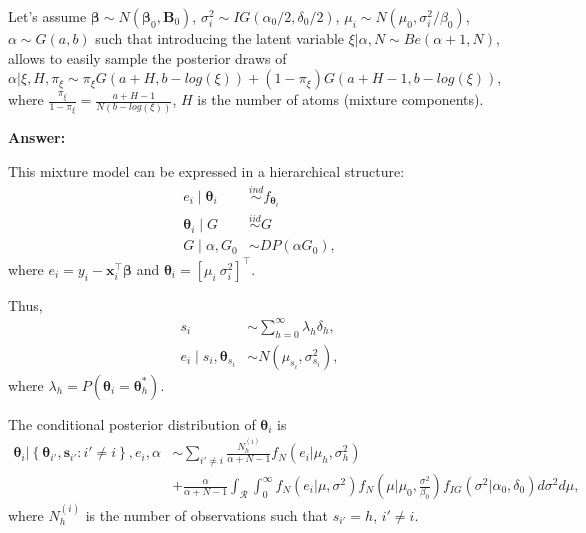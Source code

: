 \begin{enumerate}[leftmargin=*]
Let's assume $\boldsymbol{\beta}\sim N(\boldsymbol{\beta}_0,\boldsymbol{B}_0)$, $\sigma_i^2\sim IG(\alpha_0/2,\delta_0/2)$, $\mu_i\sim N(\mu_0,\sigma_i^2/\beta_0)$, $\alpha\sim G(a,b)$ such that introducing the latent variable $\xi|\alpha,N\sim Be(\alpha+1,N)$, allows to easily sample the posterior draws of  $\alpha|\xi,H,\pi_{\xi}\sim\pi_{\xi}{G}(a+H,b-log(\xi))+(1-\pi_{\xi}){G}(a+H-1,b-log(\xi))$, where $\frac{\pi_{\xi}}{1-\pi_{\xi}}=\frac{a+H-1}{N(b-log(\xi))}$, $H$ is the number of atoms (mixture components). 

\textbf{Answer:}

This mixture model can be expressed in a hierarchical structure:
\begin{align*}
	e_i\mid \boldsymbol{\theta}_i & \stackrel{ind}{\sim}f_{\boldsymbol{\theta}_i}\\
	\boldsymbol{\theta}_i \mid G & \stackrel{iid}{\sim} G\\
	G \mid \alpha,G_0 & \sim DP(\alpha G_0),
\end{align*}
where $e_i=y_i-\bm{x}_i^{\top}\bm{\beta}$ and $\boldsymbol{\theta}_i=[\mu_i \ \sigma_i^2]^{\top}$. 

Thus, 
\begin{align*}
	s_i&\sim \sum_{h=0}^{\infty}\lambda_h\delta_h,\\
	e_i\mid s_i, \boldsymbol{\theta}_{s_i}&\sim N(\mu_{s_i},\sigma^2_{s_i}),
\end{align*} 
where $\lambda_h=P(\boldsymbol{\theta}_{i}=\boldsymbol{\theta}_{h}^*)$.

The conditional posterior distribution of $\boldsymbol\theta_i$ is
\begin{align*}
	\boldsymbol\theta_i|\left\{\boldsymbol\theta_{i'},\boldsymbol s_{i'}:i'\neq i\right\}, e_i, \alpha & \sim \sum_{i'\neq i}\frac{N_h^{(i)}}{\alpha+N-1}f_N(e_i|\mu_h,\sigma_h^2)\\
	& +\frac{\alpha}{\alpha+N-1}\int_{\mathcal{R}}\int_{0}^{\infty}f_N(e_i|\mu,\sigma^2)f_N\left(\mu\Big|\mu_0,\frac{\sigma^2}{\beta_0}\right)f_{IG}(\sigma^2|\alpha_0,\delta_0)d\sigma^2 d\mu,
\end{align*}
where $N_h^{(i)}$ is the number of observations such that $s_{i'}=h$, $i'\neq i$.


\end{enumerate}
